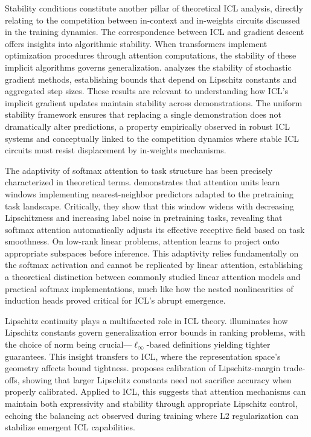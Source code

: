 \documentclass[11pt]{article}
\begin{document}
Stability conditions constitute another pillar of theoretical ICL analysis, directly relating to the competition between in-context and in-weights circuits discussed in the training dynamics. The correspondence between ICL and gradient descent offers insights into algorithmic stability. When transformers implement optimization procedures through attention computations, the stability of these implicit algorithms governs generalization. \cite{ref79} analyzes the stability of stochastic gradient methods, establishing bounds that depend on Lipschitz constants and aggregated step sizes. These results are relevant to understanding how ICL's implicit gradient updates maintain stability across demonstrations. The uniform stability framework ensures that replacing a single demonstration does not dramatically alter predictions, a property empirically observed in robust ICL systems and conceptually linked to the competition dynamics where stable ICL circuits must resist displacement by in-weights mechanisms.

The adaptivity of softmax attention to task structure has been precisely characterized in theoretical terms. \cite{ref65} demonstrates that attention units learn windows implementing nearest-neighbor predictors adapted to the pretraining task landscape. Critically, they show that this window widens with decreasing Lipschitzness and increasing label noise in pretraining tasks, revealing that softmax attention automatically adjusts its effective receptive field based on task smoothness. On low-rank linear problems, attention learns to project onto appropriate subspaces before inference. This adaptivity relies fundamentally on the softmax activation and cannot be replicated by linear attention, establishing a theoretical distinction between commonly studied linear attention models and practical softmax implementations, much like how the nested nonlinearities of induction heads proved critical for ICL's abrupt emergence.

Lipschitz continuity plays a multifaceted role in ICL theory. \cite{ref80} illuminates how Lipschitz constants govern generalization error bounds in ranking problems, with the choice of norm being crucial---\(\ell_\infty\)-based definitions yielding tighter guarantees. This insight transfers to ICL, where the representation space's geometry affects bound tightness. \cite{ref81} proposes calibration of Lipschitz-margin trade-offs, showing that larger Lipschitz constants need not sacrifice accuracy when properly calibrated. Applied to ICL, this suggests that attention mechanisms can maintain both expressivity and stability through appropriate Lipschitz control, echoing the balancing act observed during training where L2 regularization can stabilize emergent ICL capabilities.
\end{document}
